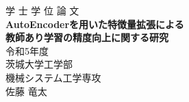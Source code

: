 \thispagestyle{empty}
\begin{center}
  \vspace*{20mm}
  {\LARGE 学 士 学 位 論 文\\}
  \vfill
  \textbf{{\huge AutoEncoderを用いた特徴量拡張による\\教師あり学習の精度向上に関する研究\\}}
  \vfill
  {\LARGE 令和5年度\\}
  \vfill
  {\LARGE 茨城大学工学部\\}
  \vfill
  {\LARGE 機械システム工学専攻\\}
  {\LARGE 佐藤 竜太\\}
  \vspace*{20mm}
\end{center}
\newpage
